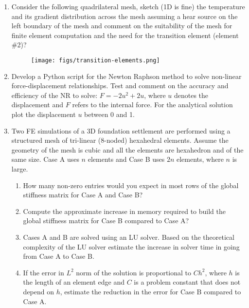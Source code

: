 \documentclass[a4paper,12pt]{article}
\begin{document}
\begin{enumerate}
	\item Consider the following quadrilateral mesh, sketch (1D is fine) the temperature and its gradient distribution across the mesh assuming a hear source on the left boundary of the mesh and comment on the suitability of the mesh for finite element computation and the need for the transition element (element \#2)?
				
		\begin{figure}[!h]
			\centering
			\texttt{[image: figs/transition-elements.png]}
		\end{figure}

	\item Develop a Python script for the Newton Raphson method to solve non-linear force-displacement relationships. Test and comment on the accuracy and efficiency of the NR to solve: $F = - 2 u^2 + 2 u$, where $u$ denotes the displacement and $F$ refers to the internal force. For the analytical solution plot the displacement $u$ between 0 and 1.
	
	
	\item Two FE simulations of a 3D foundation settlement are performed using a structured mesh of tri-linear (8-noded) hexahedral elements. Assume the geometry of the mesh is cubic and all the elements are hexahedron and of the same size. Case A uses $n$ elements and Case B uses $2n$ elements, where $n$ is large.
		\begin{enumerate}
			\item How many non-zero entries would you expect in most rows of the global stiffness matrix for Case A and Case B?
			\item Compute the approximate increase in memory required to build the global stiffness matrix for Case B compared to Case A?
			\item Cases A and B are solved using an LU solver. Based on the theoretical complexity of the LU solver estimate the increase in solver time in going from Case A to Case B.
			\item If the error in $L^2$ norm of the solution is proportional to $Ch^2$, where $h$ is the length of an element edge and $C$ is a problem constant that does not depend on $h$, estimate the reduction in the error for Case B compared to Case A.
		\end{enumerate}
\end{enumerate}
\end{document}
